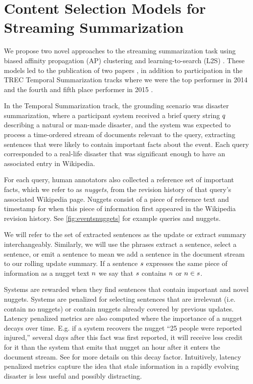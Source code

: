 \section{Content Selection Models for Streaming Summarization}

We propose two novel approaches to the streaming summarization task
using biased affinity propagation (AP) clustering \citep{frey2007clustering}
and learning-to-search (L2S) \citep{daume2009search,chang2015learning}.
These models led to the publication of two papers 
\citep{kedzie2015predicting,kedzie2016real}, in addition to participation 
in the TREC Temporal Summarization tracks where we were the top performer in
2014 and the fourth and fifth place performer in 2015 \citep{aslam2015trec,aslam2016trec}. 

In the Temporal Summarization track, the grounding scenario was disaster
summarization, where a participant system received a brief query string 
$q$ describing a natural or man-made disaster, and the system was 
expected to process a time-ordered stream of documents relevant to the query, 
extracting sentences that were likely to contain important facts about the
event. Each query corresponded to a real-life disaster that was significant
enough to have an associated entry in Wikipedia.

For each query, human annotators also collected a reference set of important 
facts, which we refer to as \textit{nuggets}, 
from the revision history of that query's associated Wikipedia page. 
Nuggets consist of a piece of reference text and timestamp for when this piece
of information first appeared in the Wikipedia revision history. 
See \autoref{fig:eventsnuggets} for example queries and nuggets.



We will refer to the set of extracted sentences as the update or extract
summary interchangeably. Similarly, we will use the phrases extract a sentence,
select a sentence, or emit a sentence to mean we add a sentence in the 
document stream to our rolling update summary. If a sentence $s$ 
expresses the same piece of information as a nugget text $n$ 
we say that $s$ contains $n$ or $n \in s$.

Systems are rewarded when they find sentences that contain important and novel
nuggets. Systems are penalized for 
selecting sentences that are irrelevant (i.e. contain no nuggets) or 
contain nuggets already covered by previous updates. 
Latency penalized metrics are also computed where
the importance of a nugget decays over time. E.g. if a system
recovers the nugget ``25 people were reported injured,'' several days
after this fact was first reported, it will receive less credit for it
than the system that emits that nugget an hour after it enters the 
document stream. See \cite{aslam2014trec} for more details on this decay 
factor. Intuitively, latency penalized metrics capture the idea that stale
information in a rapidly evolving disaster is less useful and possibly
distracting.

